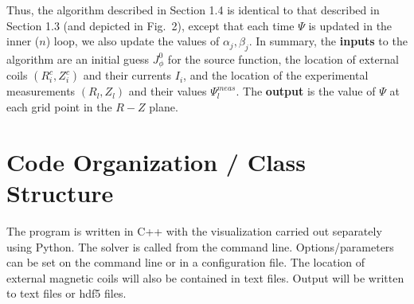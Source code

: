 \documentclass[paper=letter, fontsize=11pt]{scrartcl} %
\begin{document}
Thus, the algorithm described in Section 1.4 is identical to that described in Section 1.3 (and depicted in Fig.~2), except that each time $\Psi$ is updated in the inner ($n$) loop, we also update the values of $\alpha_j, \beta_j$.  In summary, the \textbf{inputs} to the algorithm are an initial guess $J_\phi^0$ for the source function, the location of external coils $(R_i^c,Z_i^c)$ and their currents $I_i$, and the location of the experimental measurements $(R_l,Z_l)$ and their values $\Psi_l^{meas}$.  The \textbf{output} is the value of $\Psi$ at each grid point in the $R-Z$ plane.  




\section{Code Organization / Class Structure}

The program is written in C++ with the visualization carried out separately using Python. The solver is called from the command line.  Options/parameters can be set on the command line or in a configuration file.  The location of external magnetic coils will also be contained in text files. Output will be written to text files or hdf5 files. 
\end{document}
